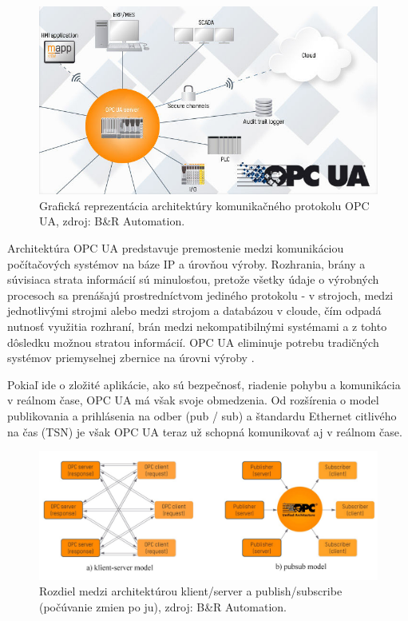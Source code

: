 \documentclass[]{tukediphc}
\begin{document}
\begin{figure}[h!]
	\centering
	\includegraphics[width=.9\textwidth,angle=0]{figures/opc-ua.jpg}
	\caption{Grafická reprezentácia architektúry komunikačného protokolu OPC UA, zdroj: B\&R Automation.}
\end{figure}

Architektúra OPC UA predstavuje premostenie medzi komunikáciou počítačových systémov na báze IP a úrovňou výroby. Rozhrania, brány a súvisiaca strata informácií sú minulosťou, pretože všetky údaje o výrobných procesoch sa prenášajú prostredníctvom jediného protokolu - v strojoch, medzi jednotlivými strojmi alebo medzi strojom a databázou v cloude, čím odpadá nutnosť využitia rozhraní, brán medzi nekompatibilnými systémami a z tohto dôsledku možnou stratou informácií. OPC UA eliminuje potrebu tradičných systémov priemyselnej zbernice na úrovni výroby \citep{brautomation}.

Pokiaľ ide o zložité aplikácie, ako sú bezpečnosť, riadenie pohybu a komunikácia v reálnom čase, OPC UA má však svoje obmedzenia. Od rozšírenia o model publikovania a prihlásenia na odber (pub / sub) a štandardu Ethernet citlivého na čas (TSN) je však OPC UA teraz už schopná komunikovať aj v reálnom čase.

\begin{figure}[!ht]
	\centering
	\includegraphics[width=1\textwidth,angle=0]{figures/opc-ua-pubsub.jpg}
	\caption{Rozdiel medzi architektúrou klient/server a publish/subscribe (počúvanie zmien po ju), zdroj: B\&R Automation.}
\end{figure}
\end{document}
